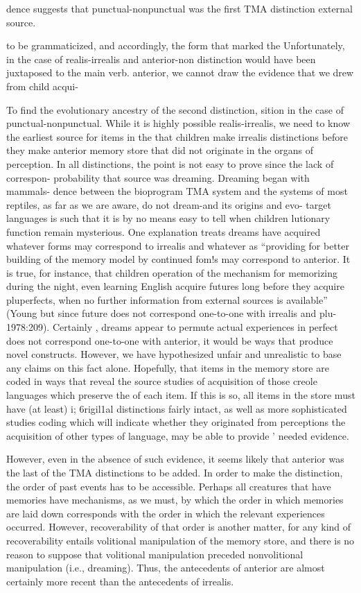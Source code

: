 dence suggests that punctual-nonpunctual was the first TMA distinction external source.

to be grammaticized, and accordingly, the form that marked the Unfortunately, in the case of realis-irrealis and anterior-non distinction would have been juxtaposed to the main verb. anterior, we cannot draw the evidence that we drew from child acqui{}-

To find the evolutionary ancestry of the second distinction, sition in the case of punctual-nonpunctual. While it is highly possible realis-irrealis, we need to know the earliest source for items in the that children make irrealis distinctions before they make anterior memory store that did not originate in the organs of perception. In all distinctions, the point is not easy to prove since the lack of correspon- probability that source was dreaming. Dreaming began with mammals- dence between the bioprogram TMA system and the systems of most reptiles, as far as we are aware, do not dream-and its origins and evo- target languages is such that it is by no means easy to tell when children lutionary function remain mysterious. One explanation treats dreams have acquired whatever forms may correspond to irrealis and whatever as ``providing for better building of the memory model by continued fom!s may correspond to anterior. It is true, for instance, that children operation of the mechanism for memorizing during the night, even learning English acquire futures long before they acquire pluperfects, when no further information from external sources is available'' (Young but since future does not correspond one-to-one with irrealis and plu- 1978:209). Certainly , dreams appear to permute actual experiences in perfect does not correspond one-to-one with anterior, it would be
ways that produce novel constructs. However, we have hypothesized unfair and unrealistic to base any claims on this fact alone. Hopefully, that items in the memory store are coded in ways that reveal the source studies of acquisition of those creole languages which preserve the
of each item. If this is so, all items in the store must have (at least) i; 6rigil1al distinctions fairly intact, as well as more sophisticated studies
coding which will indicate whether they originated from perceptions the acquisition of other types of language, may be able to provide ' needed evidence.


However, even in the absence of such evidence, it seems likely that anterior was the last of the TMA distinctions to be added. In order to make the distinction, the order of past events has to be accessible. Perhaps all creatures that have memories have mechanisms, as we must, by which the order in which memories are laid down corresponds with the order in which the relevant experiences occurred. However, recover\-ability of that order is another matter, for any kind of recoverability entails volitional manipulation of the memory store, and there is no reason to suppose that volitional manipulation preceded nonvolitional manipulation (i.e., dreaming). Thus, the antecedents of anterior are almost certainly more recent than the antecedents of irrealis.

